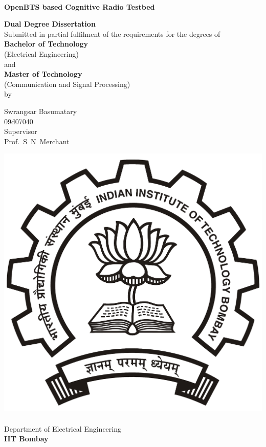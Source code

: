 \begin{titlepage}
\begin{center}
\begin{spacing}{1.0}


~\\[0.3cm]
{ \LARGE \bfseries OpenBTS based Cognitive Radio Testbed\\[1.2cm] }

\textbf{\large Dual Degree Dissertation}\\[1.2cm]

{Submitted in partial fulfilment of the requirements for the degrees 
of\\[0.1cm]
\textbf{Bachelor of Technology} \\[0.1cm]
(Electrical Engineering) \\[0.1cm]
and \\[0.1cm]
\textbf{Master of Technology}\\[0.1cm]
(Communication and Signal Processing) \\[0.3cm]
by\\[0.3cm]}

{\LARGE Swrangsar Basumatary \\[0.1cm]}
{09d07040 \\[1cm]}
{Supervisor \\[0.1cm]}
{\LARGE Prof.~S~N~Merchant \\[1.5cm]}

\includegraphics[width=0.21\textheight]{../images/iitbLogo}~\\[0.9cm]
Department of Electrical Engineering\\[0.2cm]
\textbf{\large IIT Bombay}\\[0.9cm]





\end{spacing}
\end{center}
\end{titlepage}
